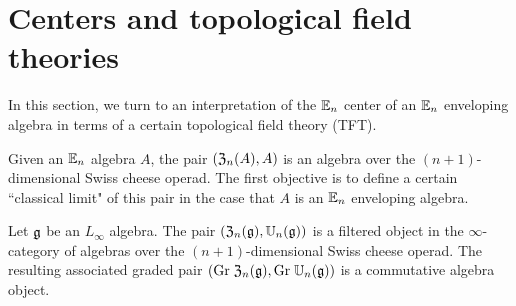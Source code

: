 \documentclass[11pt]{amsart}
\numberwithin{equation}{section}
\begin{document}
\section{Centers and topological field theories}
\label{sec: TFT}
%
%
%
%

In this section, we turn to an interpretation of the $\mathbb E_n$ center of an $\mathbb E_n$ enveloping algebra in terms of a certain topological field theory (TFT).

Given an $\mathbb E_n$ algebra $A$, the pair $(\mathfrak Z_n (A) , A)$ is an algebra over the $(n+1)$-dimensional Swiss cheese operad. 
The first objective is to define a certain ``classical limit" of this pair in the case that $A$ is an $\mathbb E_n$ enveloping algebra. 

\begin{prp}
\label{prp:swiss1}
Let $\mathfrak g$ be an $L_\infty$ algebra. 
The pair $(\mathfrak Z_n(\mathfrak g) , \mathbb U_n(\mathfrak g))$ is a filtered object in the $\infty$-category of algebras over the $(n+1)$-dimensional Swiss cheese operad. 
The resulting associated graded pair $({\rm Gr} \; \mathfrak Z_n(\mathfrak g) , {\rm Gr} \; \mathbb U_n(\mathfrak g))$ is a commutative algebra object.
\end{prp}
\end{document}
